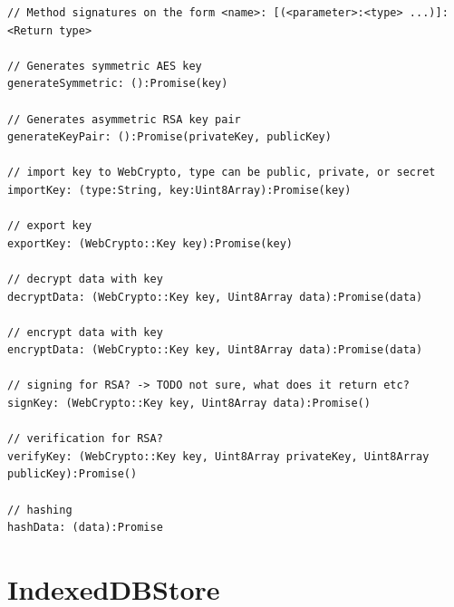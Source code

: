 \begin{Code}
\begin{lstlisting}[caption={Public methods of \texttt{RymdCrypto}}, label={lst:rymdnode}]
// Method signatures on the form <name>: [(<parameter>:<type> ...)]:<Return type>

// Generates symmetric AES key 
generateSymmetric: ():Promise(key)

// Generates asymmetric RSA key pair 
generateKeyPair: ():Promise(privateKey, publicKey)

// import key to WebCrypto, type can be public, private, or secret
importKey: (type:String, key:Uint8Array):Promise(key)

// export key
exportKey: (WebCrypto::Key key):Promise(key)

// decrypt data with key
decryptData: (WebCrypto::Key key, Uint8Array data):Promise(data)

// encrypt data with key
encryptData: (WebCrypto::Key key, Uint8Array data):Promise(data) 

// signing for RSA? -> TODO not sure, what does it return etc?
signKey: (WebCrypto::Key key, Uint8Array data):Promise()

// verification for RSA?
verifyKey: (WebCrypto::Key key, Uint8Array privateKey, Uint8Array publicKey):Promise()

// hashing
hashData: (data):Promise

\end{lstlisting}
\end{Code}


\section{IndexedDBStore}
\label{sec:indexeddbstore}

